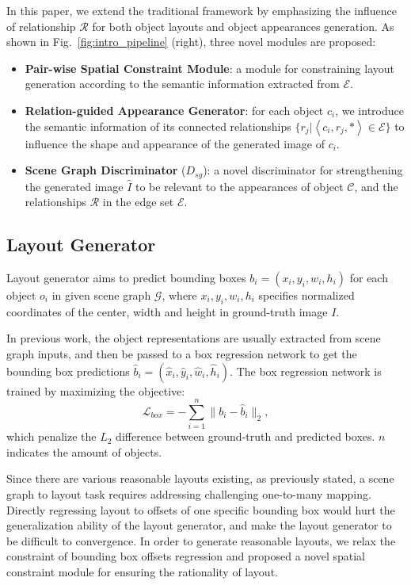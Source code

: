 In this paper, we extend the traditional framework by emphasizing the influence of relationship $\mathcal{R}$ for both object layouts and object appearances generation. As shown in Fig.~\ref{fig:intro_pipeline} (right), three novel modules are proposed:
\begin{itemize}
    \item \textbf{Pair-wise Spatial Constraint Module}: a module for constraining layout generation according to the semantic information extracted from $\mathcal{E}$. 
    \item \textbf{Relation-guided Appearance Generator}: for each object $c_i$, we introduce the semantic information of its connected relationships $\{r_{j}|\left \langle c_i, r_{j}, * \right \rangle\in\mathcal{E}\}$ to influence the shape and appearance of the generated image of $c_i$.
    \item \textbf{Scene Graph Discriminator} ($D_{sg}$): a novel discriminator for strengthening the generated image $\widehat{I}$ to be relevant to the appearances of object $\mathcal{C}$, and the relationships $\mathcal{R}$ in the edge set $\mathcal{E}$.
\end{itemize}

\subsection{Layout Generator}
Layout generator aims to predict bounding boxes $b_i=(x_i,y_i,w_i,h_i)$ for each object $o_i$ in given scene graph $\mathcal{G}$, where $x_i,y_i,w_i,h_i$ specifies normalized coordinates of the center, width and height in ground-truth image $I$.

In previous work, the object representations are usually extracted from scene graph inputs, and then be passed to a box regression network to get the bounding box predictions $\widehat{b}_{i} = (\widehat{x}_i, \widehat{y}_i, \widehat{w}_i, \widehat{h}_i)$. The box regression network is trained by maximizing the objective:
\begin{equation}
    \mathcal{L}_{box} = -\sum_{i=1}^n \parallel b_i - \widehat{b}_i \parallel_2,
\end{equation}
which penalize the $L_2$ difference between ground-truth and predicted boxes. $n$ indicates the amount of objects.

Since there are various reasonable layouts existing, as previously stated, a scene graph to layout task requires addressing challenging one-to-many mapping. Directly regressing layout to offsets of one specific bounding box would hurt the generalization ability of the layout generator, and make the layout generator to be difficult to convergence. In order to generate reasonable layouts, we relax the constraint of bounding box offsets regression and proposed a novel spatial constraint module for ensuring the rationality of layout.

